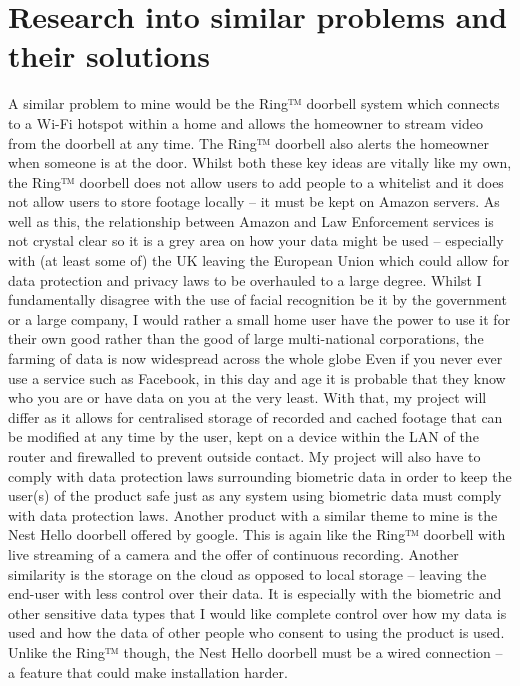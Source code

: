 \documentclass[9pt]{article}
\begin{document}
\section{Research into similar problems and their solutions}\label{sec_research}
A similar problem to mine would be the Ring™ doorbell system which connects to a Wi-Fi hotspot within a home and allows the homeowner to stream video from the doorbell at any time. The Ring™ doorbell also alerts the homeowner when someone is at the door. Whilst both these key ideas are vitally like my own, the Ring™ doorbell does not allow users to add people to a whitelist and it does not allow users to store footage locally – it must be kept on Amazon servers. As well as this, the relationship between Amazon and Law Enforcement services is not crystal clear so it is a grey area on how your data might be used – especially with (at least some of) the UK leaving the European Union which could allow for data protection and privacy laws to be overhauled to a large degree.  Whilst I fundamentally disagree with the use of facial recognition be it by the government or a large company, I would rather a small home user have the power to use it for their own good rather than the good of large multi-national corporations, the farming of data is now widespread across the whole globe  Even if you never ever use a service such as Facebook, in this day and age it is probable that they know who you are or have data on you at the very least. With that, my project will differ as it allows for centralised storage of recorded and cached footage that can be modified at any time by the user, kept on a device within the LAN of the router and firewalled to prevent outside contact. My project will also have to comply with data protection laws surrounding  biometric data in order to keep the user(s) of the product safe just as any system using biometric data must comply with data protection laws.
Another product with a similar theme to mine is the Nest Hello doorbell offered by google. This is again like the Ring™ doorbell with live streaming of a camera and the offer of continuous recording. Another similarity is the storage on the cloud as opposed to local storage – leaving the end-user with less control over their data. It is especially with the biometric and other sensitive data types that I would like complete control over how my data is used and how the data of other people who consent to using the product is used. Unlike the Ring™ though, the Nest Hello doorbell must be a wired connection – a feature that could make installation harder.  \\
\end{document}
